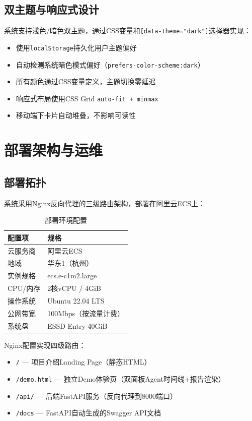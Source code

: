 \documentclass[12pt,a4paper]{ctexrep}
\begin{document}
\section{双主题与响应式设计}

系统支持浅色/暗色双主题，通过CSS变量和\texttt{[data-theme="dark"]}选择器实现：

\begin{itemize}
\item 使用\texttt{localStorage}持久化用户主题偏好
\item 自动检测系统暗色模式偏好（\texttt{prefers-color-scheme:dark}）
\item 所有颜色通过CSS变量定义，主题切换零延迟
\item 响应式布局使用CSS Grid \texttt{auto-fit + minmax}
\item 移动端下卡片自动堆叠，不影响可读性
\end{itemize}

\chapter{部署架构与运维}

\section{部署拓扑}

系统采用Nginx反向代理的三级路由架构，部署在阿里云ECS上：

\begin{table}[H]
\centering
\caption{部署环境配置}
\begin{tabular}{ll}
\toprule
\textbf{配置项} & \textbf{规格} \\
\midrule
云服务商 & 阿里云ECS \\
地域 & 华东1（杭州） \\
实例规格 & ecs.e-c1m2.large \\
CPU/内存 & 2核vCPU / 4GiB \\
操作系统 & Ubuntu 22.04 LTS \\
公网带宽 & 100Mbps（按流量计费） \\
系统盘 & ESSD Entry 40GiB \\
\bottomrule
\end{tabular}
\end{table}

Nginx配置实现四级路由：
\begin{itemize}
\item \texttt{/} — 项目介绍Landing Page（静态HTML）
\item \texttt{/demo.html} — 独立Demo体验页（双面板Agent时间线+报告渲染）
\item \texttt{/api/} — 后端FastAPI服务（反向代理到8000端口）
\item \texttt{/docs} — FastAPI自动生成的Swagger API文档
\end{itemize}
\end{document}

